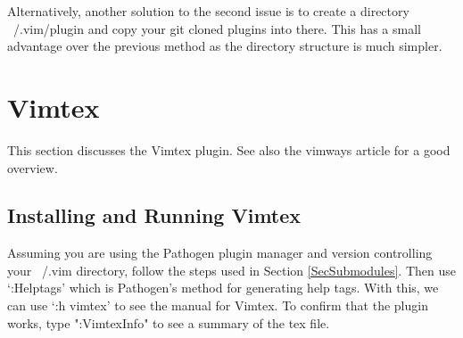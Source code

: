 \documentclass[10pt]{article}
\begin{document}
Alternatively, another solution to the second issue is to create a directory
~/.vim/plugin and copy your git cloned plugins into there. This has a small
advantage over the previous method as the directory structure is much simpler.

\section{Vimtex}
This section discusses the Vimtex \cite{lervag2015vim} plugin. See also the
vimways article \cite{woodruff2019latex} for a good overview.

\subsection{Installing and Running Vimtex}
Assuming you are using the Pathogen plugin manager and version controlling your
~/.vim directory, follow the steps used in Section \ref{SecSubmodules}. Then use
`:Helptags' which is Pathogen's method for generating help tags. With this, we
can use `:h vimtex' to see the manual for Vimtex. To confirm that the plugin
works, type ":VimtexInfo" to see a summary of the tex file.
\end{document}
